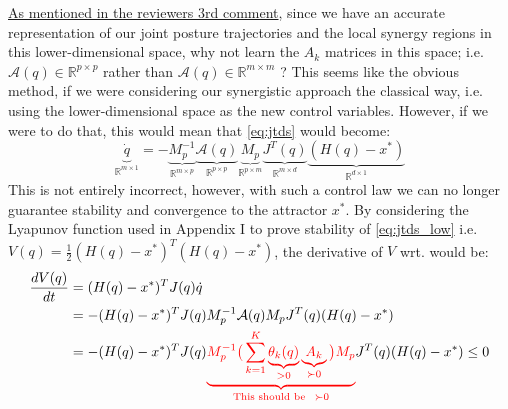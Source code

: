 \documentclass{article}
\begin{document}
\begin{enumerate}
\underline{As mentioned in the reviewers 3rd comment}, since we have an accurate representation of our joint posture trajectories and the local synergy regions in this lower-dimensional space, why not learn the $A_k$ matrices in this space; i.e. $\mathcal{A}(q)\in \mathbb{R}^{p\times p}$ rather than $\mathcal{A}(q)\in \mathbb{R}^{m\times m}$ ? This seems like the obvious method, if we were considering our synergistic approach the classical way, i.e. using the lower-dimensional space as the new control variables. However, if we were to do that, this would mean that \eqref{eq:jtds} would become:
\begin{equation}
\underbrace{\dot{q}}_{\mathbb{R}^{m\times 1}} = -\underbrace{M_p^{-1}}_{\mathbb{R}^{m\times p}}\underbrace{\mathcal{A}(q)}_{\mathbb{R}^{p\times p}}\underbrace{M_p}_{\mathbb{R}^{p\times m}}\underbrace{J^{T}(q)}_{\mathbb{R}^{m\times d}}\underbrace{(H(q)-x^*)}_{\mathbb{R}^{d\times 1}}
\label{eq:jtds_low}
\end{equation}
This is not entirely incorrect, however, with such a control law we can no longer guarantee stability and convergence to the attractor $x^{*}$. By considering the Lyapunov function used in Appendix I to prove stability of \eqref{eq:jtds_low} i.e. $V(q) = \frac{1}{2}(H(q) - x^*)^T(H(q) - x^*)$, the derivative of $ V $ wrt. would be:
\begin{equation}
\begin{aligned}
\frac{dV(q)}{dt} &= (H(q) - x^*)^TJ(q)\dot{q}\\
&= -(H(q) - x^*)^TJ(q)M_p^{-1}\mathcal{A}(q)M_pJ^T(q)(H(q) - x^*)\\
&= -(H(q) - x^*)^TJ(q)\textcolor{red}{\underbrace{M_p^{-1}\big(\sum_{k=1}^{K}\underbrace{\theta_k(q)}_{> 0}\underbrace{A_k}_{\succ 0}\big)M_p}_{\text{This should be}~~ \succ 0}}J^T(q)(H(q) - x^*)\leq 0
\end{aligned}
\end{equation}

\end{enumerate}
\end{document}
